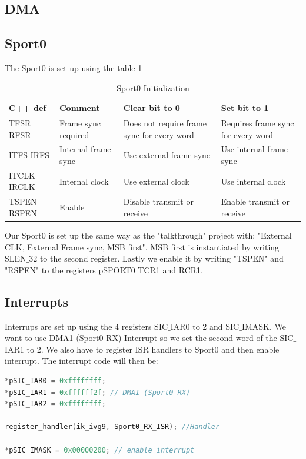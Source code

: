 \subsection{DMA}

\subsection{Sport0}
The Sport0 is set up using the table \ref{table:Sport0}
\begin{table}[htbp]
    \begin{tabular}{| p{1.5cm} | l | p{4.5cm} | p{4.5cm} |}
    \hline
    C++ def      & Comment                   & Clear bit to 0                                   & Set bit to 1                             \\ \hline
    TFSR RFSR   & Frame sync required 		 & Does not require frame sync for every word & Requires frame  					sync for every word \\ \hline
    ITFS IRFS   & Internal frame  					sync & Use external  					frame sync                    & Use internal  					frame sync            \\ \hline
    ITCLK IRCLK & Internal clock            & Use external  					clock                         & Use internal  					clock                 \\ \hline
    TSPEN RSPEN & Enable                    & Disable transmit  					or receive                & Enable transmit  					or receive         \\ \hline
    \end{tabular}
    \caption{Sport0 Initialization}
    \label{table:Sport0}
\end{table}
Our Sport0 is set up the same way as the "talkthrough" project with: "External CLK, External Frame sync, MSB first". MSB first is instantiated by writing SLEN$\_$32 to the second register. Lastly we enable it by writing "TSPEN" and "RSPEN" to the registers pSPORT0 TCR1 and RCR1.
\subsection{Interrupts}
Interrups are set up using the 4 registers SIC$\_$IAR0 to 2 and SIC$\_$IMASK. We want to use DMA1 (Sport0 RX) Interrupt so we set the second word of the SIC$\_$IAR1 to 2. We also have to register ISR handlers to Sport0 and then enable interrupt. The interrupt code will then be:
\begin{lstlisting}[language=C]
*pSIC_IAR0 = 0xffffffff;
*pSIC_IAR1 = 0xffffff2f; // DMA1 (Sport0 RX)
*pSIC_IAR2 = 0xffffffff;

register_handler(ik_ivg9, Sport0_RX_ISR); //Handler

*pSIC_IMASK = 0x00000200; // enable interrupt
\end{lstlisting}




